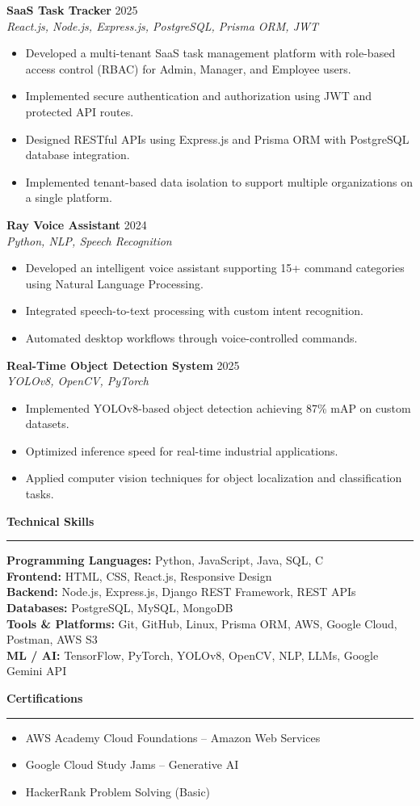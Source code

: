 \documentclass[10pt,letterpaper]{article}
\newcommand{\resumesection}[1]{
    \vspace{6pt}
    {\large\bfseries #1}
    \vspace{2pt}
    \hrule
    \vspace{3pt}
}
\begin{document}
\textbf{SaaS Task Tracker} \hfill 2025 \\
\textit{React.js, Node.js, Express.js, PostgreSQL, Prisma ORM, JWT}
\begin{itemize}
    \item Developed a multi-tenant SaaS task management platform with role-based access control (RBAC) for Admin, Manager, and Employee users.
    \item Implemented secure authentication and authorization using JWT and protected API routes.
    \item Designed RESTful APIs using Express.js and Prisma ORM with PostgreSQL database integration.
    \item Implemented tenant-based data isolation to support multiple organizations on a single platform.
\end{itemize}

\textbf{Ray Voice Assistant} \hfill 2024 \\
\textit{Python, NLP, Speech Recognition}
\begin{itemize}
    \item Developed an intelligent voice assistant supporting 15+ command categories using Natural Language Processing.
    \item Integrated speech-to-text processing with custom intent recognition.
    \item Automated desktop workflows through voice-controlled commands.
\end{itemize}

\textbf{Real-Time Object Detection System} \hfill 2025 \\
\textit{YOLOv8, OpenCV, PyTorch}
\begin{itemize}
    \item Implemented YOLOv8-based object detection achieving 87\% mAP on custom datasets.
    \item Optimized inference speed for real-time industrial applications.
    \item Applied computer vision techniques for object localization and classification tasks.
\end{itemize}

\resumesection{Technical Skills}
\textbf{Programming Languages:} Python, JavaScript, Java, SQL, C \\
\textbf{Frontend:} HTML, CSS, React.js, Responsive Design \\
\textbf{Backend:} Node.js, Express.js, Django REST Framework, REST APIs \\
\textbf{Databases:} PostgreSQL, MySQL, MongoDB \\
\textbf{Tools \& Platforms:} Git, GitHub, Linux, Prisma ORM, AWS, Google Cloud, Postman, AWS S3 \\
\textbf{ML / AI:} TensorFlow, PyTorch, YOLOv8, OpenCV, NLP, LLMs, Google Gemini API

\resumesection{Certifications}
\begin{itemize}
    \item AWS Academy Cloud Foundations -- Amazon Web Services
    \item Google Cloud Study Jams -- Generative AI
    \item HackerRank Problem Solving (Basic)
\end{itemize}
\end{document}
